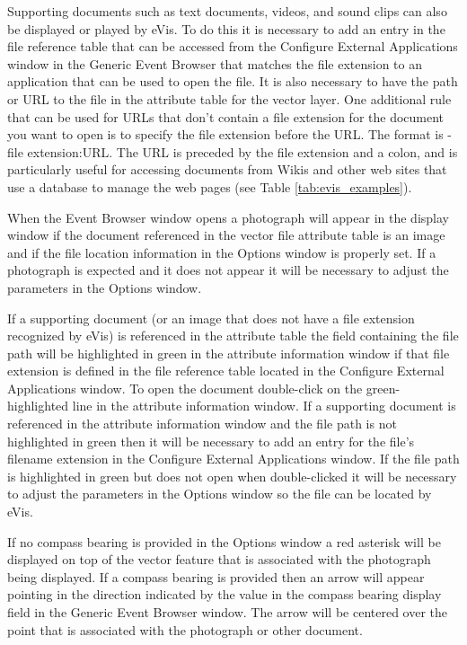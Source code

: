 \label{evis_location}

Supporting documents such as text documents, videos, and sound clips can also be displayed or played
by eVis. To do this it is necessary to add an entry in the file reference table that can be accessed
from the Configure External Applications window in the Generic Event Browser that matches the file
extension to an application that can be used to open the file. It is also necessary to have the path
or URL to the file in the attribute table for the vector layer. One
additional rule that can be used for URLs that don't contain a file extension for the document you
want to open is to specify the file extension before the URL. The format is - file extension:URL.
The URL is preceded by the file extension and a colon, and is particularly useful for accessing
documents from Wikis and other web sites that use a database to manage the web pages (see Table
\ref{tab:evis_examples}).

\label{evis_using_browser}

When the Event Browser window opens a photograph will appear in the display window if the document
referenced in the vector file attribute table is an image and if the file location information in
the Options window is properly set. If a photograph is expected and it does not appear it will be
necessary to adjust the parameters in the Options window.

If a supporting document (or an image that does not have a file extension recognized by eVis) is
referenced in the attribute table the field containing the file path will be highlighted in green in
the attribute information window if that file extension is defined in the file reference table
located in the Configure External Applications window. To open the document double-click on the
green-highlighted line in the attribute information window. If a supporting document is referenced
in the attribute information window and the file path is not highlighted in green then it will be
necessary to add an entry for the file's filename extension in the Configure External Applications
window. If the file path is highlighted in green but does not open when double-clicked it will be
necessary to adjust the parameters in the Options window so the file can be located by eVis.

If no compass bearing is provided in the Options window a red asterisk will be displayed on top of
the vector feature that is associated with the photograph being displayed.
If a compass bearing is provided then an arrow will appear pointing in the direction indicated by
the value in the compass bearing display field in the Generic Event Browser window. The arrow will
be centered over the point that is associated with the photograph or other document.

